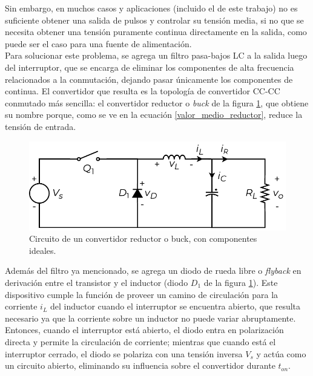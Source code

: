 Sin embargo, en muchos casos y aplicaciones (incluido el de este trabajo) no es suficiente obtener una salida de pulsos y controlar su tensión media, si no que se necesita obtener una tensión puramente continua directamente en la salida, como puede ser el caso para una fuente de alimentación.\\

Para solucionar este problema, se agrega un filtro pasa-bajos LC a la salida luego del interruptor, que se encarga de eliminar los componentes de alta frecuencia relacionados a la conmutación, dejando pasar únicamente los componentes de continua. El convertidor que resulta es la topología de convertidor CC-CC conmutado más sencilla: el {\Medium convertidor reductor} o {\Medium \textit{buck}} de la figura \ref{reductor}, que obtiene su nombre porque, como se ve en la ecuación \ref{valor_medio_reductor}, reduce la tensión de entrada.\\

\begin{figure}[h]
    \centering
    \includegraphics[scale=0.6]{Imagenes/Reductor.pdf}
    \caption{Circuito de un convertidor reductor o buck, con componentes ideales.}
    \label{reductor}
\end{figure}

Además del filtro ya mencionado, se agrega un diodo de rueda libre o \textit{flyback} en derivación entre el transistor y el inductor (diodo $D_1$ de la figura \ref{reductor}). Este dispositivo cumple la función de proveer un camino de circulación para la corriente $i_L$ del inductor cuando el interruptor se encuentra abierto, que resulta necesario ya que la corriente sobre un inductor no puede variar abruptamente. Entonces, cuando el interruptor está abierto, el diodo entra en polarización directa y permite la circulación de corriente; mientras que cuando está el interruptor cerrado, el diodo se polariza con una tensión inversa $V_s$ y actúa como un circuito abierto, eliminando su influencia sobre el convertidor durante $t_{on}$.\\

